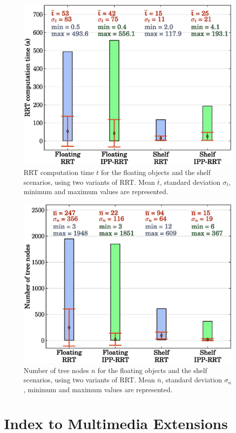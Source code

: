 \documentclass{article}
\begin{document}
\begin{figure}[H]
\centering
\includegraphics[width=0.8\linewidth]{plots/rrt-t.eps}
\caption{RRT computation time $t$ for the floating objects and the shelf
  scenarios, using two variants of RRT. Mean $\overline{t}$, standard
  deviation $\sigma_{t}$, minimum and maximum values are represented.}
\label{fig:rrt-t}
\end{figure}

\begin{figure}[H]
\centering
\includegraphics[width=0.8\linewidth]{plots/rrt-n.eps}
\caption{Number of tree nodes $n$ for the floating objects and the
  shelf scenarios, using two variants of RRT. Mean $\overline{n}$,
  standard deviation $\sigma_{n}$, minimum and maximum values are
  represented.}
\label{fig:rrt-n}
\end{figure}

\section{Index to Multimedia Extensions}
\end{document}
